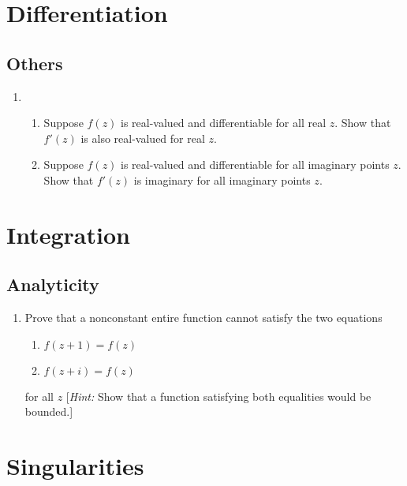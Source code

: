 \documentclass[11pt, oneside]{book}
\begin{document}
\chapter{Differentiation}
	\label{chapter:differentiation}

\section{Others} %
\label{sec:others}

\begin{enumerate}
	\item \begin{enumerate}
		\item Suppose $f(z)$ is real-valued and differentiable for all real $z$. Show that $f'(z)$ is also real-valued for real $z$.
		\item Suppose $f(z)$ is real-valued and differentiable for all imaginary points $z$. Show that $f'(z)$ is imaginary for all imaginary points $z$.
	\end{enumerate}
\end{enumerate}



\chapter{Integration}
	\label{chapter:integration}

\section{Analyticity} %
\label{sec:analyticity}

\begin{enumerate}
	\item Prove that a nonconstant entire function cannot satisfy the two equations
		\begin{enumerate}
			\item $f(z + 1) = f(z)$
			\item $f(z + i) = f(z)$
		\end{enumerate}
		for all $z$ [\textit{Hint:} Show that a function satisfying both equalities would be bounded.]
\end{enumerate}



\chapter{Singularities}
	\label{chapter:singularities}
\end{document}
